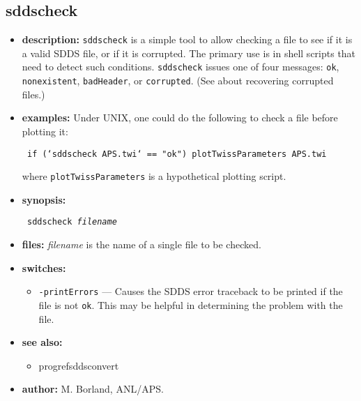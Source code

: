 \begin{latexonly}
\newpage
\end{latexonly}
\subsection{sddscheck}
\label{sddscheck}

\begin{itemize}
\item {\bf description:} {\tt sddscheck} is a simple tool to allow checking a file to see if
it is a valid SDDS file, or if it is corrupted.  The primary use is in shell scripts that need
to detect such conditions.  {\tt sddscheck} issues one of four messages: {\tt ok}, {\tt
nonexistent}, {\tt badHeader}, or {\tt corrupted}.  (See  about recovering
corrupted files.)

\item {\bf examples:} 
Under UNIX, one could do the following to check a file before plotting it:
\begin{flushleft}{\tt
if (`sddscheck APS.twi` == "ok") plotTwissParameters APS.twi
}\end{flushleft}
where {\tt plotTwissParameters} is a hypothetical plotting script.
\item {\bf synopsis:} 
\begin{flushleft}{\tt
sddscheck {\em filename}
}\end{flushleft}
\item {\bf files:}
{\em filename} is the name of a single file to be checked.
\item {\bf switches:}
\begin{itemize}
\item {\tt -printErrors} --- Causes the SDDS error traceback to be printed if the file is not \verb|ok|.
        This may be helpful in determining the problem with the file.
\end{itemize}
\item {\bf see also:}
    \begin{itemize}
    \item progref{sddsconvert}
    \end{itemize}
\item {\bf author:} M. Borland, ANL/APS.
\end{itemize}


